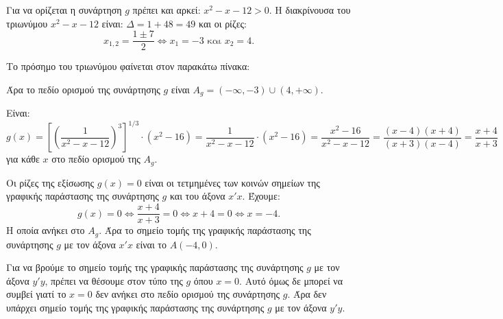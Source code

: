 
\begin{alist}
\item Για να ορίζεται η συνάρτηση $g$ πρέπει και αρκεί: $x^2 - x - 12 > 0$.
Η διακρίνουσα του τριωνύμου $x^2 - x - 12$ είναι: $\Delta = 1 + 48 = 49$
και οι ρίζες:
\[x_{1,2} = \dfrac{1 \pm 7}{2} \Leftrightarrow x_1 = -3 \text{ και } x_2 = 4.\]

Το πρόσημο του τριωνύμου φαίνεται στον παρακάτω πίνακα:

\begin{center}
\end{center}

Άρα το πεδίο ορισμού της συνάρτησης $g$ είναι $A_g = (-\infty, -3) \cup (4, +\infty)$.

\item Είναι:
\[g(x) = \left[ \left( \dfrac{1}{x^2 - x - 12} \right)^3 \right]^{1/3} \cdot (x^2 - 16) = \dfrac{1}{x^2 - x - 12} \cdot (x^2 - 16) = \dfrac{x^2 - 16}{x^2 - x - 12} = \dfrac{(x - 4)(x + 4)}{(x + 3)(x - 4)} = \dfrac{x + 4}{x + 3}\]
για κάθε $x$ στο πεδίο ορισμού της $A_g$.

\item Οι ρίζες της εξίσωσης $g(x) = 0$ είναι οι τετμημένες των κοινών σημείων της γραφικής
παράστασης της συνάρτησης $g$ και του άξονα $x'x$.
Έχουμε:
\[g(x) = 0 \Leftrightarrow \dfrac{x + 4}{x + 3} = 0 \Leftrightarrow x + 4 = 0 \Leftrightarrow x = -4.\]
Η οποία ανήκει στο $A_g$.
Άρα το σημείο τομής της γραφικής παράστασης της συνάρτησης $g$ με τον άξονα $x'x$ είναι
το $A(-4, 0)$.

Για να βρούμε το σημείο τομής της γραφικής παράστασης της συνάρτησης $g$ με τον άξονα
$y'y$, πρέπει να θέσουμε στον τύπο της $g$ όπου $x = 0$. Αυτό όμως δε μπορεί να συμβεί γιατί
το $x = 0$ δεν ανήκει στο πεδίο ορισμού της συνάρτησης $g$.
Άρα δεν υπάρχει σημείο τομής της γραφικής παράστασης της συνάρτησης $g$ με τον
άξονα $y'y$.
\end{alist}

